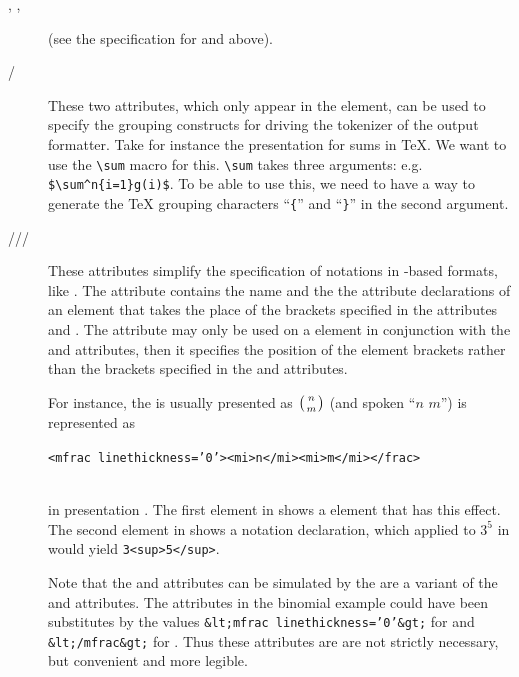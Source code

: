 \begin{description}
\item[{}, {}, {}] (see the specification
  for {} and {} above).
\item[{}/{}] These two attributes,
  which only appear in the {} element, can be used to specify the
  grouping constructs for driving the tokenizer of the output formatter.  Take for
  instance the presentation for sums in TeX. We want to use the {\verb+\sum+}
  macro for this. {\verb+\sum+} takes three arguments: e.g.
  {\verb+$\sum^n{i=1}g(i)$+}. To be able to use this, we need to have a way to
  generate the TeX grouping characters ``{\verb+{+}'' and ``{\verb+}+}'' in the
  second argument.
\item[{}/{}/{}/{}]
  These attributes simplify the specification of notations in {\xml}-based
  formats, like {\mathml}. The {}
  attribute contains the name and the {} the attribute
  declarations of an {\xml} element that takes the place of the brackets specified
  in the attributes {} and
  {}. The attribute {}
  may only be used on a {} element in conjunction with the
  {} and {} attributes, then it
  specifies the position of the element brackets rather than the brackets
  specified in the {} and
  {} attributes.
    
  For instance, the {}
  is usually presented as $\left({n\atop m}\right)$ (and spoken ``$n$
  {} $m$'') is represented as \\\strut
  \hfill{\tt{<mfrac linethickness='0'><mi>n</mi><mi>m</mi></frac>}}\hfill\strut\\
  in presentation {\mathml}. The first {} element in
  {} shows a {} element that has this
  effect. The second {} element in {}
  shows a notation declaration, which applied to $3^5$ in {\html} would yield
  {\tt{3<sup>5</sup>}}.
  
  Note that the {} and {}
  attributes can be simulated by the are a variant of the
  {} and {} attributes. The
  attributes in the binomial example could have been substitutes by the values
  {\tt{\&lt;mfrac linethickness='0'\&gt;}} for {} and
  {\tt{\&lt;/mfrac\&gt;}} for {}. Thus these attributes are
  are not strictly necessary, but convenient and more legible.
\end{description}

